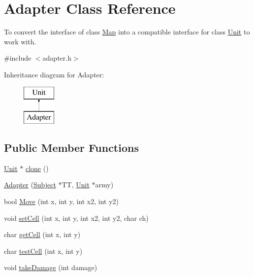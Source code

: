 \hypertarget{class_adapter}{\section{\-Adapter \-Class \-Reference}
\label{class_adapter}
}


\-To convert the interface of class \hyperlink{class_map}{\-Map} into a compatible interface for class \hyperlink{class_unit}{\-Unit} to work with.  




{\ttfamily \#include $<$adapter.\-h$>$}

\-Inheritance diagram for \-Adapter\-:\begin{figure}[H]
\begin{center}
\leavevmode
\includegraphics[height=2.000000cm]{class_adapter}
\end{center}
\end{figure}
\subsection*{\-Public \-Member \-Functions}
\begin{DoxyCompactItemize}
\item 
\hyperlink{class_unit}{\-Unit} $\ast$ \hyperlink{class_adapter_af96fb763272ef2e3001e86aa2d0b6a13}{clone} ()
\item 
\hyperlink{class_adapter_a30b53600a2372803e82f4078cfa14c68}{\-Adapter} (\hyperlink{class_subject}{\-Subject} $\ast$\-T\-T, \hyperlink{class_unit}{\-Unit} $\ast$army)
\item 
bool \hyperlink{class_adapter_a099c8e7278284871cc17a6b156c2a91f}{\-Move} (int x, int y, int x2, int y2)
\item 
void \hyperlink{class_adapter_aa9d2ae9288769d9504e2a5bdd7436f94}{set\-Cell} (int x, int y, int x2, int y2, char ch)
\item 
char \hyperlink{class_adapter_ac2bc064f26337e3b842cb3384055b1a5}{get\-Cell} (int x, int y)
\item 
char \hyperlink{class_adapter_ae85f02e71fbbace6677781a7d0367431}{test\-Cell} (int x, int y)
\item 
void \hyperlink{class_adapter_a8690d95eb87605fe8bccf3f644c3091e}{take\-Damage} (int damage)
\end{DoxyCompactItemize}


